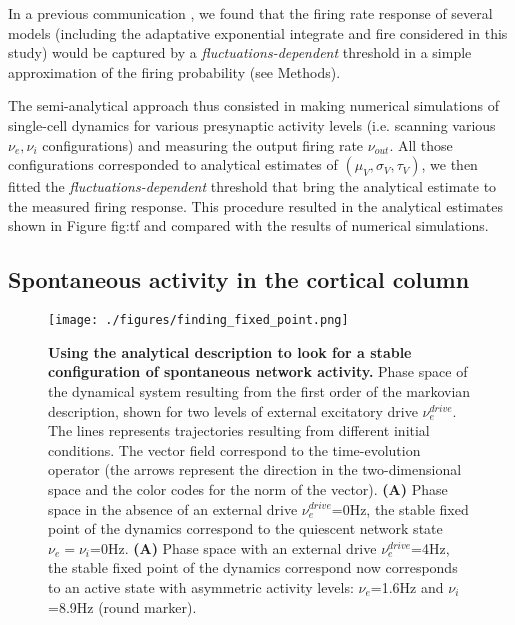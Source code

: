 \documentclass[8pt, colorlinks, a4paper]{article}
\renewcommand\ref{}
\begin{document}
In a previous communication \cite{Zerlaut2016}, we found that the firing
rate response of several models (including the adaptative exponential
integrate and fire considered in this study) would be captured by a
\emph{fluctuations-dependent} threshold in a simple approximation of the
firing probability (see Methods).

The semi-analytical approach thus consisted in making numerical
simulations of single-cell dynamics for various presynaptic activity
levels (i.e. scanning various \(\nu_e, \nu_i\) configurations) and
measuring the output firing rate \(\nu_{out}\). All those
configurations corresponded to analytical estimates of
\((\mu_V,\sigma_V,\tau_V)\), we then fitted the
\emph{fluctuations-dependent} threshold that bring the analytical estimate
to the measured firing response. This procedure resulted in the
analytical estimates shown in Figure \ref{fig:tf} and compared with the
results of numerical simulations.

\subsection{Spontaneous activity in the cortical column}
\label{sec-4-4}

\begin{figure*}
\centering
\texttt{[image: ./figures/finding\_fixed\_point.png]}
\caption{\label{fig:phase-space}\textbf{Using the analytical description to look for a stable configuration of spontaneous network activity.} Phase space of the dynamical system resulting from the first order of the markovian description, shown for two levels of external excitatory drive \(\nu_e^{drive}\). The lines represents trajectories resulting from different initial conditions. The vector field correspond to the time-evolution operator (the arrows represent the direction in the two-dimensional space and the color codes for the norm of the vector). \textbf{(A)} Phase space in the absence of an external drive \(\nu_e^{drive}\)=0Hz, the stable fixed point of the dynamics correspond to the quiescent network state \(\nu_e=\nu_i\)=0Hz. \textbf{(A)} Phase space with an external drive \(\nu_e^{drive}\)=4Hz, the stable fixed point of the dynamics correspond now corresponds to an active state with asymmetric activity levels: \(\nu_e\)=1.6Hz and \(\nu_i\)=8.9Hz (round marker).}
\end{figure*}
\end{document}

